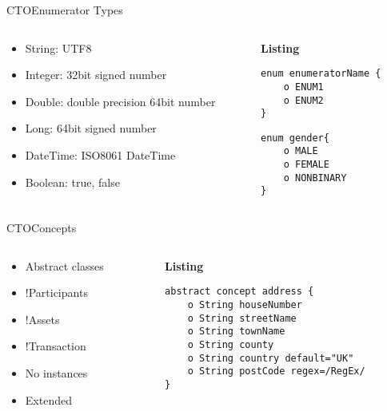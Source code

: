 \documentclass[pdf,table]{beamer}
\begin{document}
	
\begin{frame}[fragile]{CTO}{Enumerator Types}
	\begin{columns}[T]
		\begin{column}{0.48\textwidth}
			\begin{itemize}
				\item String: UTF8
				\item Integer: 32bit signed number 
				\item Double: double precision 64bit number
				\item Long: 64bit signed number 
				\item DateTime: ISO8061 DateTime
				\item Boolean: true, false
			\end{itemize}
		\end{column}
		\begin{column}{0.48\textwidth}
			{\bf Listing}
			\begin{lstlisting}[language=CTO]
enum enumeratorName {
	o ENUM1
	o ENUM2
}
			\end{lstlisting}
			\begin{lstlisting}[language=CTO]
enum gender{
	o MALE
	o FEMALE
	o NONBINARY 
}
			\end{lstlisting}
		\end{column}
	\end{columns}	
\end{frame}

\begin{frame}[fragile]{CTO}{Concepts}
	\begin{columns}[T]
		\begin{column}{0.48\textwidth}
			\begin{itemize}
				\item Abstract classes
				\item !Participants
				\item !Assets
				\item !Transaction
				\item No instances
				\item Extended
			\end{itemize}	
		\end{column}
		\begin{column}{0.48\textwidth}
			{\bf Listing}
			\begin{lstlisting}[language=CTO]
abstract concept address {
	o String houseNumber 
	o String streetName
	o String townName
	o String county 
	o String country default="UK"
	o String postCode regex=/RegEx/
}
			\end{lstlisting}
		\end{column}
	\end{columns}	
\end{frame}
	
\end{document}
